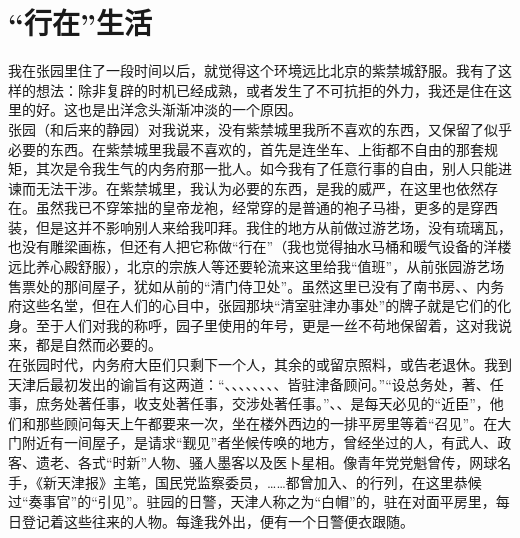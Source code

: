 \fancyhead[RO]{} %
\fancyhead[LE]{} %
\chapter*{“行在”生活}
\thispagestyle{empty}
我在张园里住了一段时间以后，就觉得这个环境远比北京的紫禁城舒服。我有了这样的想法：除非复辟的时机已经成熟，或者发生了不可抗拒的外力，我还是住在这里的好。这也是出洋念头渐渐冲淡的一个原因。\\

张园（和后来的静园）对我说来，没有紫禁城里我所不喜欢的东西，又保留了似乎必要的东西。在紫禁城里我最不喜欢的，首先是连坐车、上街都不自由的那套规矩，其次是令我生气的内务府那一批人。如今我有了任意行事的自由，别人只能进谏而无法干涉。在紫禁城里，我认为必要的东西，是我的威严，在这里也依然存在。虽然我已不穿笨拙的皇帝龙袍，经常穿的是普通的袍子马褂，更多的是穿西装，但是这并不影响别人来给我叩拜。我住的地方从前做过游艺场，没有琉璃瓦，也没有雕梁画栋，但还有人把它称做“行在”（我也觉得抽水马桶和暖气设备的洋楼远比养心殿舒服），北京的宗族人等还要轮流来这里给我“值班”，从前张园游艺场售票处的那间屋子，犹如从前的“清门侍卫处”。虽然这里已没有了南书房、、内务府这些名堂，但在人们的心目中，张园那块“清室驻津办事处”的牌子就是它们的化身。至于人们对我的称呼，园子里使用的年号，更是一丝不苟地保留着，这对我说来，都是自然而必要的。\\

在张园时代，内务府大臣们只剩下一个人，其余的或留京照料，或告老退休。我到天津后最初发出的谕旨有这两道：“、、、、、、、、皆驻津备顾问。”“设总务处，著、任事，庶务处著任事，收支处著任事，交涉处著任事。”、、是每天必见的“近臣”，他们和那些顾问每天上午都要来一次，坐在楼外西边的一排平房里等着“召见”。在大门附近有一间屋子，是请求“觐见”者坐候传唤的地方，曾经坐过的人，有武人、政客、遗老、各式“时新”人物、骚人墨客以及医卜星相。像青年党党魁曾传，网球名手，《新天津报》主笔，国民党监察委员，……都曾加入、的行列，在这里恭候过“奏事官”的“引见”。驻园的日警，天津人称之为“白帽”的，驻在对面平房里，每日登记着这些往来的人物。每逢我外出，便有一个日警便衣跟随。\\

